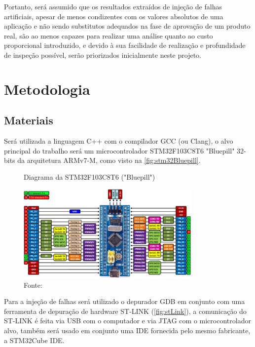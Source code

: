 Portanto, será assumido que os resultados extraídos de injeção de falhas artificiais, apesar de menos condizentes com os valores absolutos de uma aplicação e não sendo substitutos adequados na fase de aprovação de um produto real, são ao menos capazes para realizar uma análise quanto ao custo proporcional introduzido, e devido à sua facilidade de realização e profundidade de inspeção possível, serão priorizados inicialmente neste projeto.

\section{Metodologia}

\subsection{Materiais}


Será utilizada a linguagem C++ com o compilador GCC (ou Clang), o alvo principal do trabalho será um microcontrolador STM32F103C8T6 "Bluepill" 32-bits da arquitetura ARMv7-M, como visto na \autoref{fig:stm32Bluepill}.

\begin{figure}[H]
    \centering
    \captionsetup{justification=centering}
    \caption{Diagrama da STM32F103C8T6 ("Bluepill")}
    \includegraphics[width=0.80\textwidth]{assets/stm32_bluepill.png}
    \captionsetup{justification=raggedright}
    \caption*{Fonte: }
    \label{fig:stm32Bluepill}
\end{figure}

Para a injeção de falhas será utilizado o depurador GDB em conjunto com uma ferramenta de depuração de hardware ST-LINK (\autoref{fig:stLink}), a comunicação do ST-LINK é feita via USB com o computador e via JTAG com o microcontrolador alvo, também será usado em conjunto uma IDE fornecida pelo mesmo fabricante, a STM32Cube IDE.

